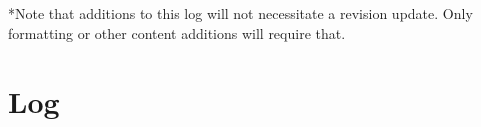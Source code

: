 \documentclass[]{auvsi_doc}
\begin{document}
\begin{AUVSITitlePage}
\begin{artifacttable} 
\end{artifacttable}
*Note that additions to this log will not necessitate a revision update. Only formatting or other content additions will require that.
\end{AUVSITitlePage}


\section{Log}

\begin{center}


\end{center}
\end{document}
